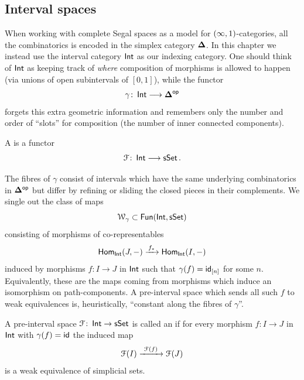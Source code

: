 \subsection{Interval spaces}

When working with complete Segal spaces as a model for $(\operatorname{\infty},1)$-categories, all the combinatorics is encoded in the simplex category $\mathbf\Delta$. In this chapter we instead use the interval category $\operatorname{\mathsf{Int}}$ as our indexing category. One should think of $\operatorname{\mathsf{Int}}$ as keeping track of \emph{where} composition of morphisms is allowed to happen (via unions of open subintervals of $[0,1]$), while the functor
\begin{equation}
  \gamma \colon \operatorname{\mathsf{Int}} \longrightarrow \mathbf\Delta^{\mathsf{op}}
\end{equation}
forgets this extra geometric information and remembers only the number and order of “slots” for composition (the number of inner connected components).

\begin{definition}
A  is a functor
\begin{equation}
  \mathcal F \colon \operatorname{\mathsf{Int}} \longrightarrow \operatorname{\sf sSet}.
\end{equation}
\end{definition}

The fibres of $\gamma$ consist of intervals which have the same underlying combinatorics in $\mathbf\Delta^{\mathsf{op}}$ but differ by refining or sliding the closed pieces in their complements. We single out the class of maps
\begin{equation}
  \mathcal W_{\gamma} \subset \operatorname{{\sf Fun}}(\operatorname{\mathsf{Int}},\operatorname{\sf sSet})
\end{equation}
consisting of morphisms of co-representables
\begin{equation}
  \operatorname{\sf Hom}_{\operatorname{\mathsf{Int}}}(J,-) \xrightarrow{\,f_*\,} \operatorname{\sf Hom}_{\operatorname{\mathsf{Int}}}(I,-)
\end{equation}
induced by morphisms $f\colon I \to J$ in $\operatorname{\mathsf{Int}}$ such that $\gamma(f)=\operatorname{\sf id}_{[n]}$ for some $n$. Equivalently, these are the maps coming from morphisms which induce an isomorphism on path-components. A pre-interval space which sends all such $f$ to weak equivalences is, heuristically, “constant along the
fibres of $\gamma$”.

\begin{definition}
A pre-interval space $\mathcal F\colon \operatorname{\mathsf{Int}} \to \operatorname{\sf sSet}$ is called an  if for every morphism $f\colon I \to J$ in $\operatorname{\mathsf{Int}}$ with $\gamma(f)=\operatorname{\sf id}$ the induced map
\begin{equation}
  \mathcal F(I) \xrightarrow{\ \mathcal F(f)\ } \mathcal F(J)
\end{equation}
is a weak equivalence of simplicial sets.
\end{definition}

